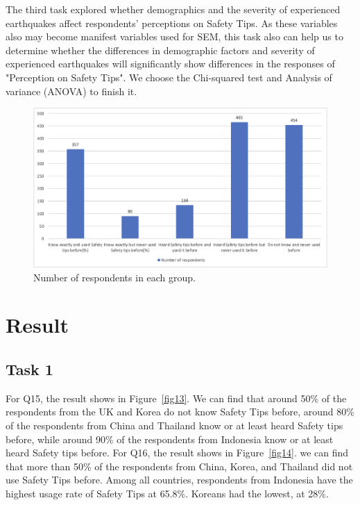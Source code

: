 The third task explored whether demographics and the severity of experienced earthquakes affect respondents' perceptions on Safety Tips. As these variables also may become manifest variables used for SEM, this task also can help us to determine whether the differences in demographic factors and severity of experienced earthquakes will significantly show differences in the responses of "Perception on Safety Tips". We choose the Chi-squared test and Analysis of variance (ANOVA) to finish it.


\begin{figure}[h]
  \includegraphics[width=0.4\linewidth]{Figure/Figure6.jpg}
  \centering
  \caption{Number of respondents in each group. }
  \label{fig6}
\end{figure}




\section{Result}

\subsection{Task 1}
For Q15, the result shows in Figure~\ref{fig13}. We can find that around 50\% of the respondents from the UK and Korea do not know Safety Tips before, around 80\% of the respondents from China and Thailand know or at least heard Safety tips before, while around 90\% of the respondents from Indonesia know or at least heard Safety tips before. For Q16, the result shows in Figure~\ref{fig14}. we can find that more than 50\% of the respondents from China, Korea, and Thailand did not use Safety Tips before. Among all countries, respondents from Indonesia have the highest usage rate of Safety Tips at 65.8\%. Koreans had the lowest, at 28\%. 

